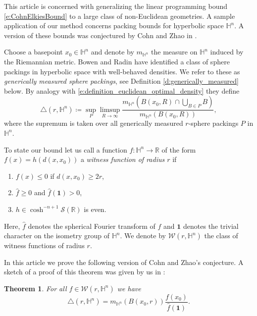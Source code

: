 \documentclass[12pt,reqno,a4paper]{amsart}
\theoremstyle{theorem}
\newtheorem{mainthm}{Theorem}
\theoremstyle{definition}
\numberwithin{theorem}{section}
\numberwithin{equation}{section}
\newcommand{\R}{\mathbb{R}}
\begin{document}
This article is concerned with generalizing the linear programming bound \eqref{e:CohnElkiesBound} to a large class of non-Euclidean geometries. 
A sample application of our method concerns packing bounds for hyperbolic space $\mathbb{H}^n$. A version of these bounds was conjectured by Cohn and Zhao in \cite{CohnZhao}. 


Choose a basepoint  $x_0\in \mathbb{H}^n$ and denote by  $m_{\mathbb{H}^n}$ the measure on $\mathbb{H}^n$ induced by the Riemannian metric. Bowen and Radin \cite{Bowen2003, Bowen2004} have identified a class of sphere packings in hyperbolic space with well-behaved densities. We refer to these as \emph{generically measured sphere packings}, see Definition \ref{d:generically_measured} below.
By analogy with \eqref{e:definition_euclidean_optimal_density} they define
\[\triangle(r,\mathbb{H}^n)\coloneqq \sup_P\limsup_{R\to \infty} \frac{m_{\mathbb{H}^n}(B(x_0,R)\cap \bigcup_{B\in P}B)}{m_{\mathbb{H}^n}(B(x_0,R))},\]
where the supremum is taken over all generically measured $r$-sphere packings $P$ in $\mathbb{H}^n$.

To state our bound let us call a function $f:\mathbb{H}^n\to \R$ of the form $f(x) = h(d(x,x_0))$ a \emph{witness function of radius $r$} if
\begin{enumerate}[(W1)]
	\item $f(x)\leq 0$ if $d(x,x_0)\geq 2r$,
	\item $\widehat{f}\geq 0$ and $\widehat{f}(\mathbf{1})>0$,
	\item $h\in \cosh^{-n+1}\mathscr{S}(\R)$ is even.
\end{enumerate}
Here, $\widehat{f}$ denotes the spherical Fourier transform of $f$ and $\mathbf{1}$ denotes the trivial character on the isometry group of $\mathbb{H}^n$.
We denote by $\mathcal{W}(r,\mathbb{H}^n)$  the class of witness functions of radius $r$.

In this article we prove the following version of Cohn and Zhao's conjecture. A sketch of a proof of this theorem was given by us in \cite{Wackenhuth1}:
\begin{mainthm}\label{t:mainthm1}
	For all $f\in\mathcal{W}(r, \mathbb{H}^n)$ we have
	\[\triangle(r,\mathbb{H}^n) = m_{\mathbb{H}^n}(B(x_0,r))\frac{f(x_0)}{\widehat{f}(\mathbf{1})}.\]
\end{mainthm}
\end{document}
